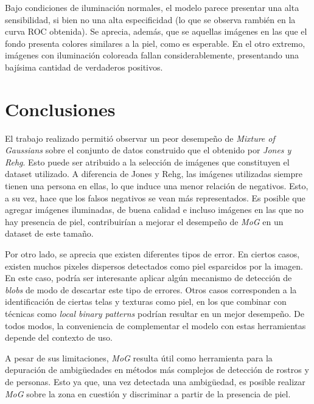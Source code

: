 \documentclass[12pt]{article}
\begin{document}
Bajo condiciones de iluminación normales, el modelo parece presentar una alta
sensibilidad, si bien no una alta especificidad (lo que se observa rambién en la
curva ROC obtenida). Se aprecia, además, que se aquellas imágenes en las que el
fondo presenta colores similares a la piel, como es esperable. En el otro
extremo, imágenes con iluminación coloreada fallan considerablemente,
presentando una bajísima cantidad de verdaderos positivos.

\section{Conclusiones}




El trabajo realizado permitió observar un peor desempeño de
\emph{Mixture of Gaussians} sobre el conjunto de datos construido que el
obtenido por \emph{Jones y Rehg}. Esto puede ser atribuido a la selección de
imágenes que constituyen el dataset utilizado. A diferencia de Jones y Rehg, las
imágenes utilizadas siempre tienen una persona en ellas, lo que induce una menor
relación de negativos. Esto, a su vez, hace que los falsos negativos se vean más
representados. Es posible que agregar imágenes iluminadas, de buena calidad e
incluso imágenes en las que no hay presencia de piel, contribuirían a mejorar el
desempeño de \emph{MoG} en un dataset de este tamaño.

Por otro lado, se aprecia que existen diferentes tipos de error. En ciertos
casos, existen muchos pixeles dispersos detectados como piel esparcidos por la
imagen. En este caso, podría ser interesante aplicar algún mecanismo de
detección de \emph{blobs} de modo de descartar este tipo de errores. Otros casos
corresponden a la identificación de ciertas telas y texturas como piel, en los
que combinar con técnicas como \emph{local binary patterns} podrían resultar en
un mejor desempeño. De todos modos, la conveniencia de complementar el modelo
con estas herramientas depende del contexto de uso.

A pesar de sus limitaciones, \emph{MoG} resulta útil como herramienta para la
depuración de ambigüedades en métodos más complejos de detección de rostros y de
personas. Esto ya que, una vez detectada una ambigüedad, es posible realizar
\emph{MoG} sobre la zona en cuestión y discriminar a partir de la presencia de
piel.





\end{document}
